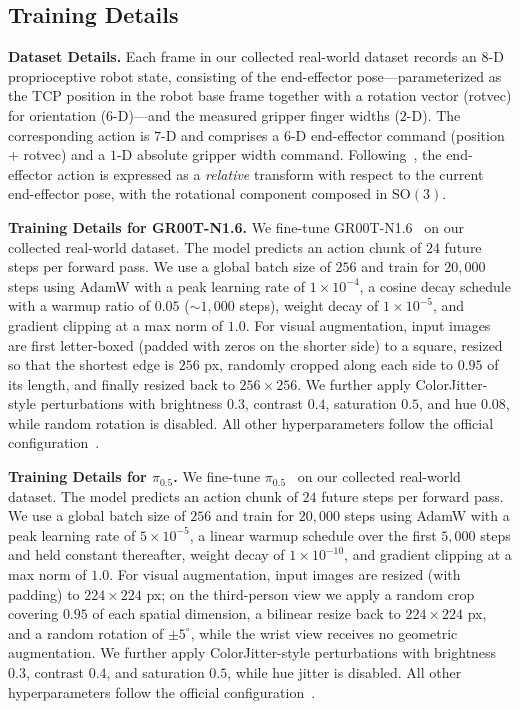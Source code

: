 \subsection{Training Details}
\label{supp:sec:subsec:real-world-training-details}
\noindent\textbf{Dataset Details.}
Each frame in our collected real-world dataset records an $8$-D proprioceptive robot state, consisting of the end-effector pose---parameterized as the TCP position in the robot base frame together with a rotation vector (rotvec) for orientation ($6$-D)---and the measured gripper finger widths ($2$-D). The corresponding action is $7$-D and comprises a $6$-D end-effector command (position $+$ rotvec) and a $1$-D absolute gripper width command. Following~\cite{chi2024universal}, the end-effector action is expressed as a \emph{relative} transform with respect to the current end-effector pose, with the rotational component composed in $\mathrm{SO}(3)$.

\noindent\textbf{Training Details for GR00T-N1.6.}
We fine-tune GR00T-N1.6~\cite{gr00tn1_2025} on our collected real-world dataset. The model predicts an action chunk of $24$ future steps per forward pass. We use a global batch size of $256$ and train for $20{,}000$ steps using AdamW with a peak learning rate of $1{\times}10^{-4}$, a cosine decay schedule with a warmup ratio of $0.05$ ($\sim\!1{,}000$ steps), weight decay of $1{\times}10^{-5}$, and gradient clipping at a max norm of $1.0$. For visual augmentation, input images are first letter-boxed (padded with zeros on the shorter side) to a square, resized so that the shortest edge is $256$ px, randomly cropped along each side to $0.95$ of its length, and finally resized back to $256\times 256$. We further apply ColorJitter-style perturbations with brightness $0.3$, contrast $0.4$, saturation $0.5$, and hue $0.08$, while random rotation is disabled. All other hyperparameters follow the official configuration~\cite{gr00tn1_2025}.

\noindent\textbf{Training Details for $\pi_{0.5}$.}
We fine-tune $\pi_{0.5}$~\cite{pi05} on our collected real-world dataset. The model predicts an action chunk of $24$ future steps per forward pass. We use a global batch size of $256$ and train for $20{,}000$ steps using AdamW with a peak learning rate of $5{\times}10^{-5}$, a linear warmup schedule over the first $5{,}000$ steps and held constant thereafter, weight decay of $1{\times}10^{-10}$, and gradient clipping at a max norm of $1.0$. For visual augmentation, input images are resized (with padding) to $224{\times}224$ px; on the third-person view we apply a random crop covering $0.95$ of each spatial dimension, a bilinear resize back to $224{\times}224$ px, and a random rotation of $\pm 5^{\circ}$, while the wrist view receives no geometric augmentation. We further apply ColorJitter-style perturbations with brightness $0.3$, contrast $0.4$, and saturation $0.5$, while hue jitter is disabled. All other hyperparameters follow the official configuration~\cite{pi05}.

